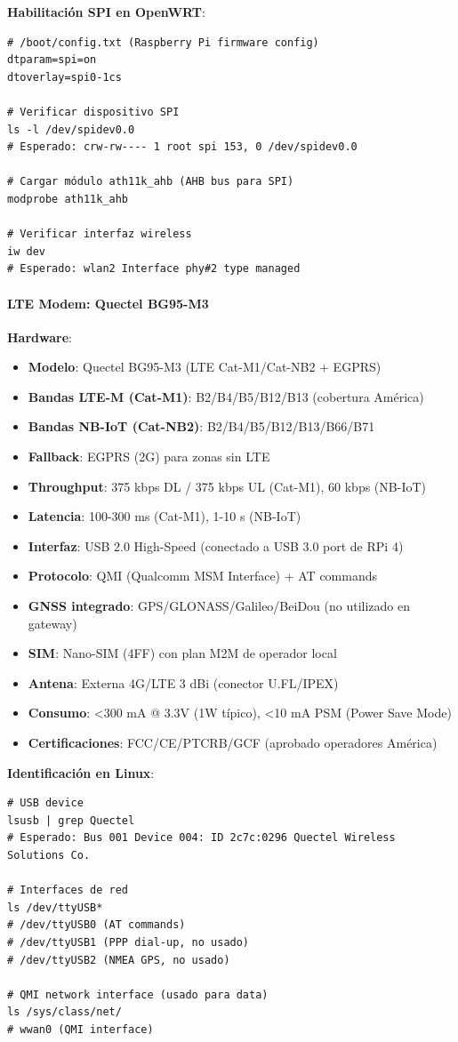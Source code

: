 \textbf{Habilitación SPI en OpenWRT}:
\begin{verbatim}
# /boot/config.txt (Raspberry Pi firmware config)
dtparam=spi=on
dtoverlay=spi0-1cs

# Verificar dispositivo SPI
ls -l /dev/spidev0.0
# Esperado: crw-rw---- 1 root spi 153, 0 /dev/spidev0.0

# Cargar módulo ath11k_ahb (AHB bus para SPI)
modprobe ath11k_ahb

# Verificar interfaz wireless
iw dev
# Esperado: wlan2 Interface phy#2 type managed
\end{verbatim}

\paragraph{LTE Modem: Quectel BG95-M3}

\textbf{Hardware}:
\begin{itemize}
    \item \textbf{Modelo}: Quectel BG95-M3 (LTE Cat-M1/Cat-NB2 + EGPRS)
    \item \textbf{Bandas LTE-M (Cat-M1)}: B2/B4/B5/B12/B13 (cobertura América)
    \item \textbf{Bandas NB-IoT (Cat-NB2)}: B2/B4/B5/B12/B13/B66/B71
    \item \textbf{Fallback}: EGPRS (2G) para zonas sin LTE
    \item \textbf{Throughput}: 375 kbps DL / 375 kbps UL (Cat-M1), 60 kbps (NB-IoT)
    \item \textbf{Latencia}: 100-300 ms (Cat-M1), 1-10 s (NB-IoT)
    \item \textbf{Interfaz}: USB 2.0 High-Speed (conectado a USB 3.0 port de RPi 4)
    \item \textbf{Protocolo}: QMI (Qualcomm MSM Interface) + AT commands
    \item \textbf{GNSS integrado}: GPS/GLONASS/Galileo/BeiDou (no utilizado en gateway)
    \item \textbf{SIM}: Nano-SIM (4FF) con plan M2M de operador local
    \item \textbf{Antena}: Externa 4G/LTE 3 dBi (conector U.FL/IPEX)
    \item \textbf{Consumo}: <300 mA @ 3.3V (1W típico), <10 mA PSM (Power Save Mode)
    \item \textbf{Certificaciones}: FCC/CE/PTCRB/GCF (aprobado operadores América)
\end{itemize}

\textbf{Identificación en Linux}:
\begin{verbatim}
# USB device
lsusb | grep Quectel
# Esperado: Bus 001 Device 004: ID 2c7c:0296 Quectel Wireless Solutions Co.

# Interfaces de red
ls /dev/ttyUSB*
# /dev/ttyUSB0 (AT commands)
# /dev/ttyUSB1 (PPP dial-up, no usado)
# /dev/ttyUSB2 (NMEA GPS, no usado)

# QMI network interface (usado para data)
ls /sys/class/net/
# wwan0 (QMI interface)
\end{verbatim}

